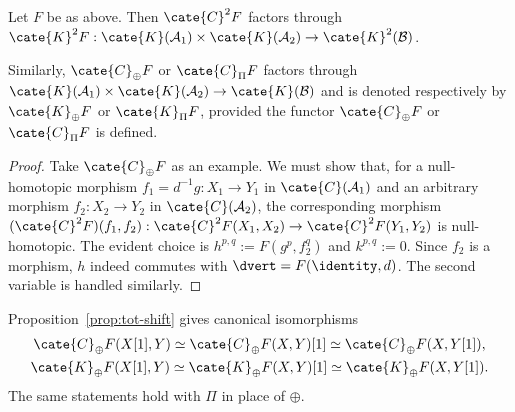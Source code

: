 \begin{proposition}\label{prop:bifunctor-cplx-homotopy}
	Let $F$ be as above. Then $\cate{C}^2F$ factors through
	$\cate{K}^2F:\cate{K}(\mathcal{A}_1)\times\cate{K}(\mathcal{A}_2)\to
	\cate{K}^2(\mathcal{B})$.

	Similarly, $\cate{C}_{\oplus}F$ or $\cate{C}_{\Pi}F$ factors through
	$\cate{K}(\mathcal{A}_1)\times\cate{K}(\mathcal{A}_2)\to
	\cate{K}(\mathcal{B})$ and is denoted respectively by
	$\cate{K}_{\oplus}F$ or $\cate{K}_{\Pi}F$, provided the functor
	$\cate{C}_{\oplus}F$ or $\cate{C}_{\Pi}F$ is defined.
\end{proposition}
\begin{proof}
	Take $\cate{C}_{\oplus}F$ as an example. We must show that, for a
	null-homotopic morphism $f_1=d^{-1}g:X_1\to Y_1$ in
	$\cate{C}(\mathcal{A}_1)$ and an arbitrary morphism $f_2:X_2\to Y_2$ in
	$\cate{C}(\mathcal{A}_2)$, the corresponding morphism
	$(\cate{C}^2F)(f_1,f_2):\cate{C}^2F(X_1,X_2)\to
	\cate{C}^2F(Y_1,Y_2)$ is null-homotopic. The evident choice is
	$h^{p,q}:=F(g^p,f_2^q)$ and $k^{p,q}:=0$. Since $f_2$ is a morphism,
	$h$ indeed commutes with $\dvert=F(\identity,d)$. The second variable is
	handled similarly.
\end{proof}

Proposition~\ref{prop:tot-shift} gives canonical isomorphisms
\begin{gather*}
	\cate{C}_{\oplus} F(X[1], Y) \simeq \cate{C}_{\oplus}F(X, Y)[1] \simeq \cate{C}_{\oplus}F(X, Y[1]), \\
	\cate{K}_{\oplus} F(X[1], Y) \simeq \cate{K}_{\oplus}F(X, Y)[1] \simeq \cate{K}_{\oplus}F(X, Y[1]).
\end{gather*}
The same statements hold with $\Pi$ in place of $\oplus$.

